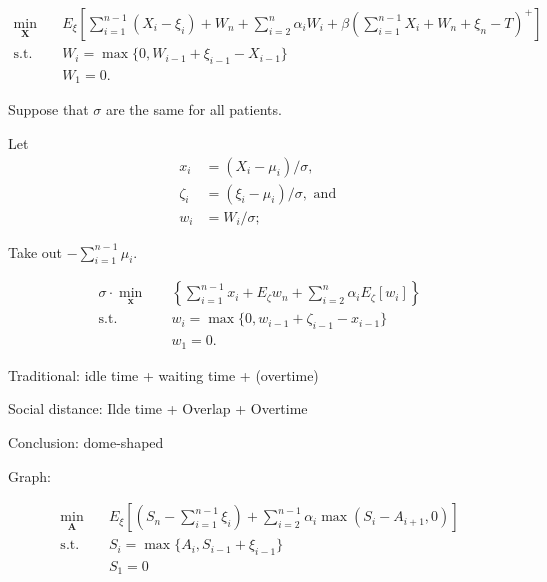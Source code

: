 \documentclass{article}
\begin{document}
\begin{equation}
    \begin{aligned}
        \min_{\mathbf{X}} \quad & E_{\xi}\left[\sum_{i=1}^{n-1} (X_{i} - \xi_{i}) + W_{n} + \sum_{i=2}^n \alpha_i W_{i} + \beta(\sum_{i=1}^{n-1} X_i + W_n + \xi_{n} -T)^{+} \right] \\
        \mbox{s.t.} \quad & W_{i} = \max\{0, W_{i-1} + \xi_{i-1} - X_{i-1}\} \\
        & W_{1} = 0.
    \end{aligned}
\end{equation}

Suppose that $\sigma$ are the same for all patients.

Let
\begin{align}
    x_i & = \left(X_i- \mu_i \right) / \sigma, \\
    \zeta_i & = \left(\xi_i-\mu_i\right) / \sigma, \text { and } \\
    w_i & = W_i / \sigma;
\end{align}

Take out $- \sum_{i=1}^{n-1} \mu_{i}$.

\begin{equation}
    \begin{aligned}
        \sigma \cdot \min _{\mathbf{x}} \quad & \left\{\sum_{i=1}^{n-1} x_i+ E_{\zeta} w_n + \sum_{i=2}^n \alpha_i E_\zeta\left[w_i\right]\right\} \\
        \mbox{s.t.} \quad & w_{i} = \max\{0, w_{i-1} + \zeta_{i-1} - x_{i-1}\} \\
        & w_{1} = 0.
    \end{aligned}
\end{equation}

Traditional: idle time + waiting time + (overtime)

Social distance: Ilde time + Overlap + Overtime

Conclusion: dome-shaped

Graph: 

\begin{equation}
    \begin{aligned}
        \min_{\mathbf{A}} \quad & E_{\xi}\left[\left(S_n-\sum_{i=1}^{n-1} \xi_i\right)+ \sum_{i=2}^{n-1} \alpha_i \max(S_i-A_{i+1}, 0)  \right] \\
        \mbox {s.t.} \quad & S_{i} = \max\{A_{i}, S_{i-1} + \xi_{i-1}\} \\
        & S_{1} = 0
    \end{aligned}
\end{equation}
\end{document}
